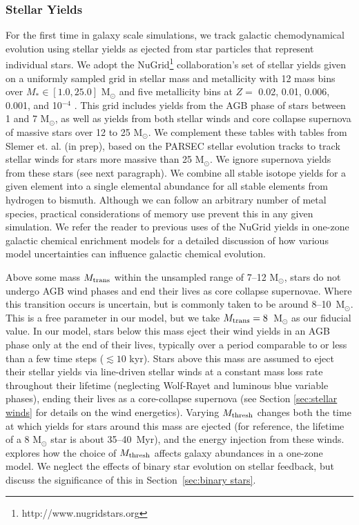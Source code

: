 \documentclass[twocolumn]{aastex61}
\begin{document}
\subsubsection{Stellar Yields}
\label{sec:yields}
For the first time in galaxy scale simulations, we track galactic chemodynamical evolution using stellar yields as ejected from star particles that represent individual stars. We adopt the NuGrid\footnote{http://www.nugridstars.org} collaboration's set of stellar yields given on a uniformly sampled grid in stellar mass and metallicity with 12 mass bins over $M_{*} \in \left[1.0, 25.0\right]$ M$_{\odot}$ and five metallicity bins at $Z =$ 0.02, 0.01, 0.006, 0.001, and 10$^{-4}$ \citep{Pignatari2016, Ritter2017}. This grid includes yields from the AGB phase of stars between 1 and 7 M$_{\odot}$, as well as yields from both stellar winds and core collapse supernova of massive stars over 12 to 25 M$_{\odot}$. We complement these tables with tables from Slemer et. al. (in prep), based on the PARSEC stellar evolution tracks \citep{Bressan2012, Tang2014} to track stellar winds for stars more massive than 25 M$_{\odot}$. We ignore supernova yields from these stars (see next paragraph). We combine all stable isotope yields for a given element into a single elemental abundance for all stable elements from hydrogen to bismuth. Although we can follow an arbitrary number of metal species, practical considerations of memory use prevent this in any given simulation. We refer the reader to previous uses of the NuGrid yields in one-zone galactic chemical enrichment models \citep{Cote2016,  Cote2016_feb,Cote2017} for a detailed discussion of how various model uncertainties can influence galactic chemical evolution.

Above some mass $M_{\rm trans}$ within the unsampled range of 7--12 M$_{\odot}$, stars do not undergo AGB wind phases and end their lives as core collapse supernovae. Where this transition occurs is uncertain, but is commonly taken to be around 8--10~M$_{\odot}$. This is a free parameter in our model, but we take $M_{\rm trans} = 8$~M$_{\odot}$ as our fiducial value. In our model, stars below this mass eject their wind yields in an AGB phase only at the end of their lives, typically over a period comparable to or less than a few time steps ($\lesssim 10$ kyr). Stars above this mass are assumed to eject their stellar yields via line-driven stellar winds at a constant mass loss rate throughout their lifetime (neglecting Wolf-Rayet and luminous blue variable phases), ending their lives as a core-collapse supernova (see Section \ref{sec:stellar winds} for details on the wind energetics). Varying $M_{\rm thresh}$ changes both the time at which yields for stars around this mass are ejected (for reference, the lifetime of a 8 M$_{\odot}$ star is about 35--40~Myr), and the energy injection from these winds. \citet{Cote2017} explores how the choice of $M_{\rm thresh}$ affects galaxy abundances in a one-zone model. We neglect the effects of binary star evolution on stellar feedback, but discuss the significance of this in Section~\ref{sec:binary stars}.
\end{document}
